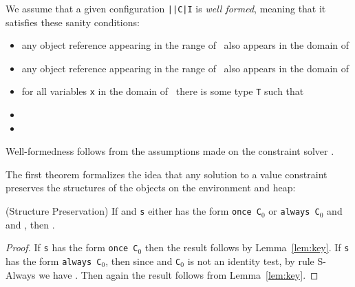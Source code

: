 
We
assume that a given configuration {\tt \Euid|\Huid|C|I} is {\em well
  formed}, meaning that it satisfies these sanity conditions:
\begin{itemize}
  \item any object reference appearing in the range of \Euid\ also
    appears in the domain of \Huid  
 \item any object reference appearing in the range of \Huid\ also
    appears in the domain of \Huid
 \item for all variables {\tt x} in the domain of \Euid\ there is some
   type {\tt T} such that 
 \item {}
 \item {}
\end{itemize}
Well-formedness follows from the assumptions made on the constraint
solver \where.

The
first theorem formalizes the idea that any solution to a value
constraint preserves the structures of the objects on the
environment and heap:

\begin{Theorem} (Structure Preservation)
 If \emph{}
 and {\tt s} either has the form {\tt once C$_0$} or {\tt always
   C$_0$} and \emph{} and
\emph{}, then
  \emph{}. 
\end{Theorem}
\begin{proof}
If {\tt s} has the form {\tt once C$_0$} then the result follows by
Lemma~\ref{lem:key}.  If {\tt s} has the form {\tt always C$_0$}, then
since
 and {\tt C$_0$} is not an identity test, by
rule {\sc S-Always} we have 
.
Then again the result follows from Lemma~\ref{lem:key}.
\end{proof}

